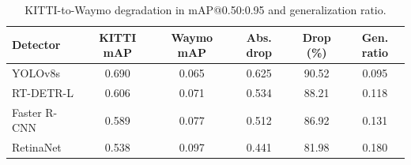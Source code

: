 \begin{table}[t]
    \centering
    \caption{KITTI-to-Waymo degradation in mAP@0.50:0.95 and generalization ratio.}
    \label{tab:kitti_vs_waymo}
    \begin{tabular}{lccccc}
        \toprule
        Detector & KITTI mAP & Waymo mAP & Abs. drop & Drop (\%) & Gen. ratio \\
        \midrule
        YOLOv8s & 0.690 & 0.065 & 0.625 & 90.52 & 0.095 \\
        RT-DETR-L & 0.606 & 0.071 & 0.534 & 88.21 & 0.118 \\
        Faster R-CNN & 0.589 & 0.077 & 0.512 & 86.92 & 0.131 \\
        RetinaNet & 0.538 & 0.097 & 0.441 & 81.98 & 0.180 \\
        \bottomrule
    \end{tabular}
\end{table}
